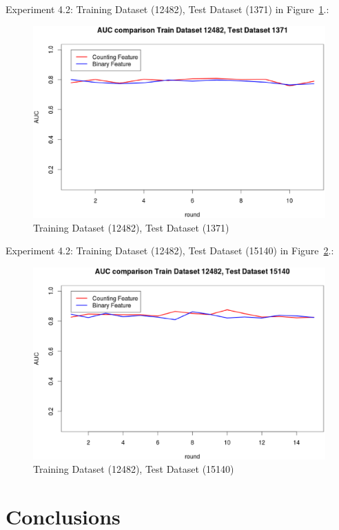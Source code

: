 \documentclass{sig-alternate}
\begin{document}
Experiment 4.2: Training Dataset  (12482), Test Dataset  (1371) in Figure~\ref{fig:fig10}.:
\begin{figure}[h]
\centering
\includegraphics[width=\columnwidth]{12482_1371.eps}
\caption{Training Dataset  (12482), Test Dataset  (1371)}
\label{fig:fig10}
\end{figure}

Experiment 4.2: Training Dataset  (12482), Test Dataset  (15140) in Figure~\ref{fig:fig11}.:
\begin{figure}[h]
\centering
\includegraphics[width=\columnwidth]{12482_15140.eps}
\caption{Training Dataset  (12482), Test Dataset  (15140)}
\label{fig:fig11}
\end{figure}

\fi





\section{Conclusions}
 
\end{document}
